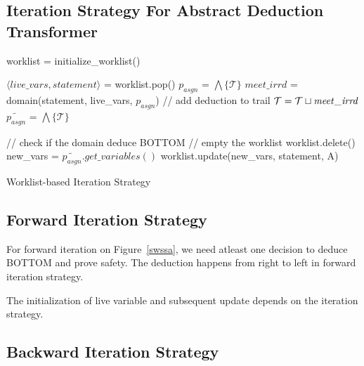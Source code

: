 \subsection{Iteration Strategy For Abstract Deduction Transformer}
\begin{algorithm2e}[t]
\DontPrintSemicolon
{}
\begin{small}
\assign worklist = initialize\_worklist() \;
{
  \assign $\langle live\_vars, statement \rangle$ = worklist.pop() \;
  \assign $p_{asgn}$ = $\bigwedge\{\mathcal{T}\}$ \; 
  \assign $\mathit{meet\_irrd}$ = domain(statement, live\_vars, $p_{asgn}$)\;
  // add deduction to trail \;
  $\mathcal{T} = \mathcal{T} \sqcup \mathit{meet\_irrd}$ \; 
  \assign $\widetilde{p_{asgn}}$ = $\bigwedge\{\mathcal{T}\}$ \; 

  // check if the domain deduce BOTTOM \;
   {
    // empty the worklist \;
    worklist.delete() \;
    \return \safe \;
  }
  \uElse
  {
    \assign new\_vars = $\widetilde{p_{asgn}}.get\_variables()$ \;
    worklist.update(new\_vars, statement, A) \; 
  }
}
\return \unknown \;
\end{small}
\caption{Worklist-based Iteration Strategy\label{Alg:iteration}}
\end{algorithm2e}


\subsection{Forward Iteration Strategy}
For forward iteration on Figure~\ref{swssa}, we need atleast 
one decision to deduce BOTTOM and prove safety. The deduction 
happens from right to left in forward iteration strategy.

The initialization of live variable and subsequent update depends on the iteration strategy.

\subsection{Backward Iteration Strategy}

